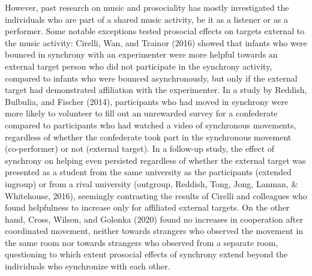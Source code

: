 \documentclass[
  man,floatsintext]{apa6}
\begin{document}
However, past research on music and prosociality has mostly investigated the individuals who are part of a shared music activity, be it as a listener or as a performer. Some notable exceptions tested prosocial effects on targets external to the music activity: Cirelli, Wan, and Trainor (2016) showed that infants who were bounced in synchrony with an experimenter were more helpful towards an external target person who did not participate in the synchrony activity, compared to infants who were bounced asynchronously, but only if the external target had demonstrated affiliation with the experimenter. In a study by Reddish, Bulbulia, and Fischer (2014), participants who had moved in synchrony were more likely to volunteer to fill out an unrewarded survey for a confederate compared to participants who had watched a video of synchronous movements, regardless of whether the confederate took part in the synchronous movement (co-performer) or not (external target). In a follow-up study, the effect of synchrony on helping even persisted regardless of whether the external target was presented as a student from the same university as the participants (extended ingroup) or from a rival university (outgroup, Reddish, Tong, Jong, Lanman, \& Whitehouse, 2016), seemingly contrasting the results of Cirelli and colleagues who found helpfulness to increase only for affiliated external targets. On the other hand, Cross, Wilson, and Golonka (2020) found no increases in cooperation after coordinated movement, neither towards strangers who observed the movement in the same room nor towards strangers who observed from a separate room, questioning to which extent prosocial effects of synchrony extend beyond the individuals who synchronize with each other.
\end{document}
